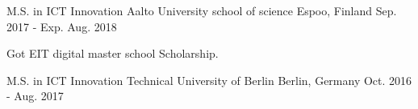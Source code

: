 

\begin{cventries}

  \cventry
    {M.S. in ICT Innovation} %
    {Aalto University school of science} %
    {Espoo, Finland} %
    {Sep. 2017 - Exp. Aug. 2018} %
    {
      \begin{cvitems} %
        \item {Got EIT digital master school Scholarship.}
      \end{cvitems}
    }
    
  \cventry
    {M.S. in ICT Innovation} %
    {Technical University of Berlin} %
    {Berlin, Germany} %
    {Oct. 2016 - Aug. 2017} %
    {}
\end{cventries}
